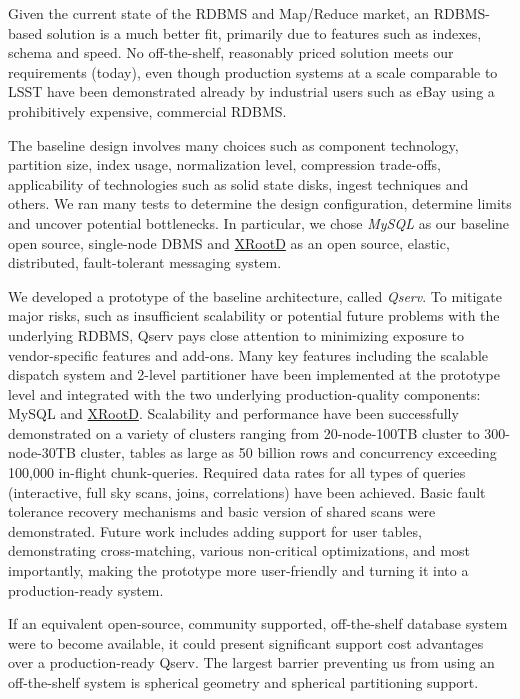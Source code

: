 \documentclass[DM,lsstdraft,toc]{lsstdoc}
\begin{document}
Given the current state of the RDBMS and Map/Reduce market, an
RDBMS-based solution is a much better fit, primarily due to features
such as indexes, schema and speed. No off-the-shelf, reasonably priced
solution meets our requirements (today), even though production systems
at a scale comparable to LSST have been demonstrated already by
industrial users such as eBay using a prohibitively expensive,
commercial RDBMS.

The baseline design involves many choices such as component technology,
partition size, index usage, normalization level, compression
trade-offs, applicability of technologies such as solid state disks,
ingest techniques and others. We ran many tests to determine the design
configuration, determine limits and uncover potential bottlenecks. In
particular, we chose \emph{MySQL} as our baseline open source,
single-node DBMS and \href{http://xrootd.org}{XRootD} as an open source,
elastic, distributed, fault-tolerant messaging system.

We developed a prototype of the baseline architecture, called
\emph{Qserv}. To mitigate major risks, such as insufficient scalability
or potential future problems with the underlying RDBMS, Qserv pays close
attention to minimizing exposure to vendor-specific features and
add-ons. Many key features including the scalable dispatch system and
2-level partitioner have been implemented at the prototype level and
integrated with the two underlying production-quality components: MySQL
and \href{http://xrootd.org}{XRootD}. Scalability and performance have
been successfully demonstrated on a variety of clusters ranging from
20-node-100TB cluster to 300-node-30TB cluster, tables as large as 50
billion rows and concurrency exceeding 100,000 in-flight chunk-queries.
Required data rates for all types of queries (interactive, full sky
scans, joins, correlations) have been achieved. Basic fault tolerance
recovery mechanisms and basic version of shared scans were demonstrated.
Future work includes adding support for user tables, demonstrating
cross-matching, various non-critical optimizations, and most
importantly, making the prototype more user-friendly and turning it into
a production-ready system.

If an equivalent open-source, community supported, off-the-shelf
database system were to become available, it could present significant
support cost advantages over a production-ready Qserv. The largest
barrier preventing us from using an off-the-shelf system is spherical
geometry and spherical partitioning support.
\end{document}
